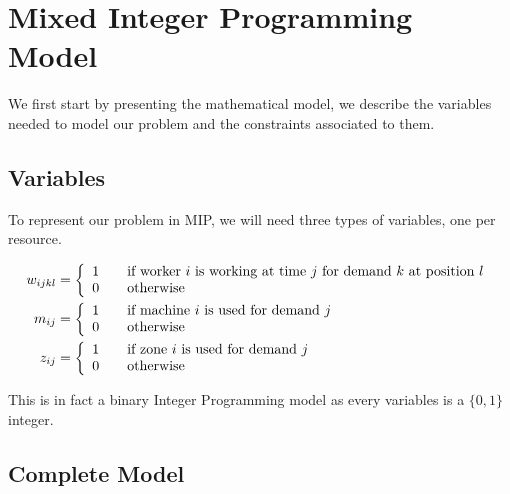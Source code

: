 \documentclass[../../thesis.tex]{subfiles}
\begin{document}
\section{Mixed Integer Programming Model}
\label{section:mipmodel}

We first start by presenting the mathematical model, we describe the variables
needed to model our problem and the constraints associated to them.

\subsection{Variables}

To represent our problem in MIP, we will need three types of variables, one per resource.



\begin{equation*}
\begin{split}
    w_{ijkl} &=  \left \{
                   \begin{array}{l l}
                      1 \quad & \textrm{if worker $i$ is working at time $j$ for demand $k$ at position $l$} \\
                      0 \quad & \textrm{otherwise} 
                   \end{array}
                   \right . \\
   m_{ij} &=  \left \{
                   \begin{array}{l l}
                      1 \quad & \textrm{if machine $i$ is used for demand $j$} \\
                      0 \quad & \textrm{otherwise} 
                   \end{array}
                   \right . \\
    z_{ij} &= \left \{
               \begin{array}{l l}
                  1 \quad & \textrm{if zone $i$ is used for demand $j$} \\
                  0 \quad & \textrm{otherwise} 
               \end{array}
               \right . \\
\end{split}
\end{equation*}

This is in fact a binary Integer Programming model as every variables is a $\{0, 1\}$ integer.

\subsection{Complete Model}
\end{document}
